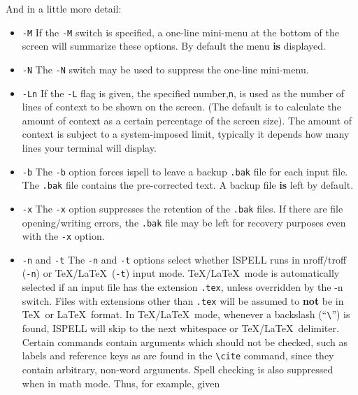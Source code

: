 And in a little more detail:

\begin{itemize}
\item {\Large\tt -M} \sunspec{\\}{}
If the \verb+-M+ switch is specified, a one-line mini-menu at the bottom of the
screen will summarize these options. By default the menu {\bf is} displayed.

\item {\Large\tt -N} \sunspec{\\}{}
The \verb+-N+ switch may be used to suppress the one-line mini-menu.

\item {\Large\tt -Ln} \sunspec{\\}{}
If the \verb+-L+ flag is given, the specified number,\verb+n+, is used as the
number of lines of context to be shown on the screen.  (The default is to
calculate the amount of context as a certain percentage of the screen
size).  The amount of context is subject to a system-imposed limit, typically
it depends how many lines your terminal will display.

\item {\Large\tt -b} \sunspec{\\}{}
The \verb+-b+ option forces ispell to leave a backup \verb+.bak+ file for each
input file.
The \verb+.bak+ file contains the pre-corrected text.
A backup file {\bf is} left by default.

\item {\Large\tt -x} \sunspec{\\}{}
The \verb+-x+ option suppresses the retention of the \verb+.bak+ files.
If there are file opening/writing errors, the \verb+.bak+ file may be left for
recovery purposes even with the \verb+-x+ option.

\item {\Large\tt -n} and {\Large\tt -t}\sunspec{\\}{}
The \verb+-n+ and \verb+-t+ options select whether ISPELL runs in nroff/troff
(\verb+-n+) or \TeX /\LaTeX\ (\verb+-t+) input mode.
\TeX /\LaTeX\ mode is automatically selected if an input file has the extension
\verb+.tex+, unless overridden by the -n switch.
Files with extensions other than \verb+.tex+ will be assumed to {\bf not} be in
\TeX\ or \LaTeX\ format.
In \TeX /\LaTeX\ mode, whenever a backslash (``\verb+\+'') is found, ISPELL
will skip to the next whitespace or \TeX /\LaTeX\ delimiter.
Certain commands contain arguments which should not be checked, such as labels
and reference keys as are found in the \verb+\cite+ command, since they contain
arbitrary, non-word arguments.
Spell checking is also suppressed when in math mode.
Thus, for example, given


\end{itemize}
